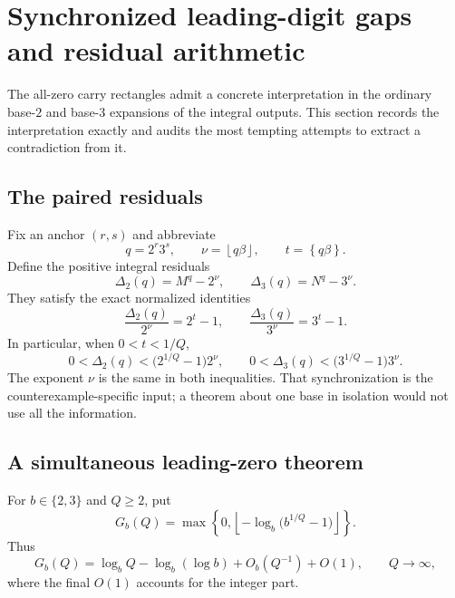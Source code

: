 \documentclass[11pt]{article}
\theoremstyle{definition}
\theoremstyle{remark}
\newcommand{\fract}[1]{\left\{#1\right\}}
\newcommand{\floor}[1]{\left\lfloor#1\right\rfloor}
\begin{document}
\section{Synchronized leading-digit gaps and residual arithmetic}
\label{sec:leading-gaps}

The all-zero carry rectangles admit a concrete interpretation in the ordinary
base-$2$ and base-$3$ expansions of the integral outputs.  This section records the
interpretation exactly and audits the most tempting attempts to extract a
contradiction from it.

\subsection{The paired residuals}

Fix an anchor $(r,s)$ and abbreviate
\begin{equation}\label{eq:anchor-abbreviations}
 q=2^r3^s,\qquad \nu=\floor{q\beta},\qquad t=\fract{q\beta}.
\end{equation}
Define the positive integral residuals
\begin{equation}\label{eq:paired-residuals}
 \Delta_2(q)=M^q-2^\nu,
 \qquad
 \Delta_3(q)=N^q-3^\nu.
\end{equation}
They satisfy the exact normalized identities
\begin{equation}\label{eq:normalized-residuals}
 \frac{\Delta_2(q)}{2^\nu}=2^t-1,
 \qquad
 \frac{\Delta_3(q)}{3^\nu}=3^t-1.
\end{equation}
In particular, when $0<t<1/Q$,
\begin{equation}\label{eq:residual-upper-bounds}
 0<\Delta_2(q)<\bigl(2^{1/Q}-1\bigr)2^\nu,
 \qquad
 0<\Delta_3(q)<\bigl(3^{1/Q}-1\bigr)3^\nu.
\end{equation}
The exponent $\nu$ is the same in both inequalities.  That synchronization is the
counterexample-specific input; a theorem about one base in isolation would not use
all the information.

\subsection{A simultaneous leading-zero theorem}

For $b\in\{2,3\}$ and $Q\ge2$, put
\begin{equation}\label{eq:gap-functions}
 G_b(Q)=\max\left\{0,
  \floor{-\log_b\bigl(b^{1/Q}-1\bigr)}\right\}.
\end{equation}
Thus
\begin{equation}\label{eq:gap-asymptotics}
 G_b(Q)=\log_b Q-\log_b(\log b)+O_b(Q^{-1})+O(1),
 \qquad Q\longrightarrow\infty,
\end{equation}
where the final $O(1)$ accounts for the integer part.
\end{document}
